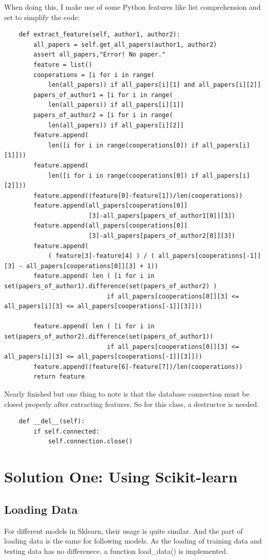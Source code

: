 \documentclass[a4paper]{article}
\begin{document}
When doing this, I make use of some Python features like list comprehension and set to simplify the code:
\begin{verbatim}
    def extract_feature(self, author1, author2):
        all_papers = self.get_all_papers(author1, author2)
        assert all_papers,"Error! No paper."
        feature = list()
        cooperations = [i for i in range(
            len(all_papers)) if all_papers[i][1] and all_papers[i][2]]
        papers_of_author1 = [i for i in range(
            len(all_papers)) if all_papers[i][1]]
        papers_of_author2 = [i for i in range(
            len(all_papers)) if all_papers[i][2]]
        feature.append(
            len([i for i in range(cooperations[0]) if all_papers[i][1]]))
        feature.append(
            len([i for i in range(cooperations[0]) if all_papers[i][2]]))
        feature.append((feature[0]-feature[1])/len(cooperations))
        feature.append(all_papers[cooperations[0]]
                       [3]-all_papers[papers_of_author1[0]][3])
        feature.append(all_papers[cooperations[0]]
                       [3]-all_papers[papers_of_author2[0]][3])
        feature.append(
            ( feature[3]-feature[4] ) / ( all_papers[cooperations[-1]][3] - all_papers[cooperations[0]][3] + 1))
        feature.append( len ( [i for i in set(papers_of_author1).difference(set(papers_of_author2) )
                            if all_papers[cooperations[0]][3] <= all_papers[i][3] <= all_papers[cooperations[-1]][3]]))

        feature.append( len ( [i for i in set(papers_of_author2).difference(set(papers_of_author1))
                            if all_papers[cooperations[0]][3] <= all_papers[i][3] <= all_papers[cooperations[-1]][3]]))
        feature.append((feature[6]-feature[7])/len(cooperations))
        return feature
\end{verbatim}
Nearly finished but one thing to note is that the database connection must be closed properly after extracting features. So for this class, a destructor is needed.
\begin{verbatim}
    def __del__(self):
        if self.connected:
            self.connection.close()
\end{verbatim}
    \newpage
    \section{Solution One: Using Scikit-learn}
        \subsection{Loading Data}
For different models in Sklearn, their usage is quite similar. And the part of loading data is the same for following models. As the loading of training data and testing data has no differenece, a function load\_data() is implemented.
\end{document}
